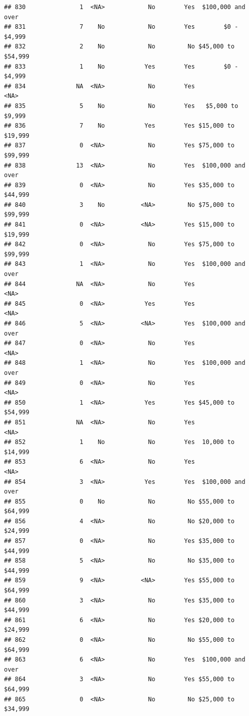 \documentclass[man]{apa6}
\begin{document}
\begin{verbatim}
## 830               1  <NA>            No        Yes  $100,000 and over
## 831               7    No            No        Yes        $0 - $4,999
## 832               2    No            No         No $45,000 to $54,999
## 833               1    No           Yes        Yes        $0 - $4,999
## 834              NA  <NA>            No        Yes               <NA>
## 835               5    No            No        Yes   $5,000 to $9,999
## 836               7    No           Yes        Yes $15,000 to $19,999
## 837               0  <NA>            No        Yes $75,000 to $99,999
## 838              13  <NA>            No        Yes  $100,000 and over
## 839               0  <NA>            No        Yes $35,000 to $44,999
## 840               3    No          <NA>         No $75,000 to $99,999
## 841               0  <NA>          <NA>        Yes $15,000 to $19,999
## 842               0  <NA>            No        Yes $75,000 to $99,999
## 843               1  <NA>            No        Yes  $100,000 and over
## 844              NA  <NA>            No        Yes               <NA>
## 845               0  <NA>           Yes        Yes               <NA>
## 846               5  <NA>          <NA>        Yes  $100,000 and over
## 847               0  <NA>            No        Yes               <NA>
## 848               1  <NA>            No        Yes  $100,000 and over
## 849               0  <NA>            No        Yes               <NA>
## 850               1  <NA>           Yes        Yes $45,000 to $54,999
## 851              NA  <NA>            No        Yes               <NA>
## 852               1    No            No        Yes  10,000 to $14,999
## 853               6  <NA>            No        Yes               <NA>
## 854               3  <NA>           Yes        Yes  $100,000 and over
## 855               0    No            No         No $55,000 to $64,999
## 856               4  <NA>            No         No $20,000 to $24,999
## 857               0  <NA>            No        Yes $35,000 to $44,999
## 858               5  <NA>            No         No $35,000 to $44,999
## 859               9  <NA>          <NA>        Yes $55,000 to $64,999
## 860               3  <NA>            No        Yes $35,000 to $44,999
## 861               6  <NA>            No        Yes $20,000 to $24,999
## 862               0  <NA>            No         No $55,000 to $64,999
## 863               6  <NA>            No        Yes  $100,000 and over
## 864               3  <NA>            No        Yes $55,000 to $64,999
## 865               0  <NA>            No         No $25,000 to $34,999

\end{verbatim}
\end{document}
